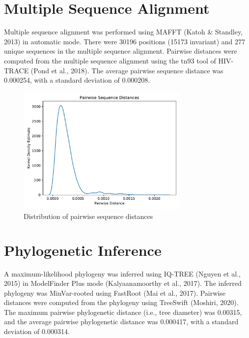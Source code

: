 \documentclass{article}
\begin{document}
\section{Multiple Sequence Alignment}
Multiple sequence alignment was performed using MAFFT (Katoh \& Standley, 2013) in automatic mode.
There were 30196 positions (15173 invariant) and 277 unique sequences in the multiple sequence alignment.
Pairwise distances were computed from the multiple sequence alignment using the tn93 tool of HIV-TRACE (Pond et al., 2018).
The average pairwise sequence distance was 0.000254,
with a standard deviation of 0.000208.


\begin{figure}[h]
\centering
\includegraphics[width=0.75\textwidth,keepaspectratio]{./figs/pairwise_distances_sequences.pdf}
\caption{Distribution of pairwise sequence distances}
\end{figure}

\section{Phylogenetic Inference}
A maximum-likelihood phylogeny was inferred using IQ-TREE (Nguyen et al., 2015) in ModelFinder Plus mode (Kalyaanamoorthy et al., 2017).
The inferred phylogeny was MinVar-rooted using FastRoot (Mai et al., 2017).
Pairwise distances were computed from the phylogeny using TreeSwift (Moshiri, 2020).
The maximum pairwise phylogenetic distance (i.e., tree diameter) was 0.00315,
and the average pairwise phylogenetic distance was 0.000417,
with a standard deviation of 0.000314.
\end{document}
